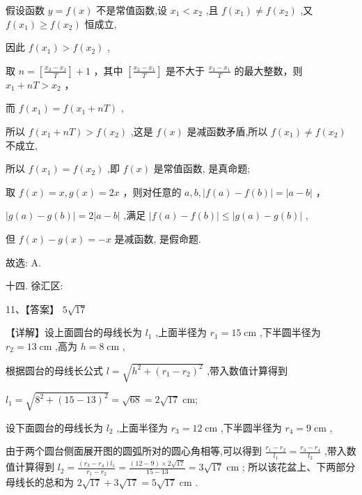 \documentclass[10pt]{article}
\newcommand*\circled[1]{\tikz[baseline=(char.base)]{\node[shape=circle,draw,inner sep=1.5pt] (char) {\small #1};}}
\begin{document}
假设函数 \(y = f\left( x\right)\) 不是常值函数,设 \({x}_{1} < {x}_{2}\) ,且 \(f\left( {x}_{1}\right)  \neq  f\left( {x}_{2}\right)\) ,又 \(f\left( {x}_{1}\right)  \geq  f\left( {x}_{2}\right)\) 恒成立,

因此 \(f\left( {x}_{1}\right)  > f\left( {x}_{2}\right)\) ,

取 \(n = \left\lbrack  \frac{{x}_{2} - {x}_{1}}{T}\right\rbrack   + 1\) ，其中 \(\left\lbrack  \frac{{x}_{2} - {x}_{1}}{T}\right\rbrack\) 是不大于 \(\frac{{x}_{2} - {x}_{1}}{T}\) 的最大整数，则 \({x}_{1} + {nT} > {x}_{2}\) ，

而 \(f\left( {x}_{1}\right)  = f\left( {{x}_{1} + {nT}}\right)\) ,

所以 \(f\left( {{x}_{1} + {nT}}\right)  > f\left( {x}_{2}\right)\) ,这是 \(f\left( x\right)\) 是减函数矛盾,所以 \(f\left( {x}_{1}\right)  \neq  f\left( {x}_{2}\right)\) 不成立,

所以 \(f\left( {x}_{1}\right)  = f\left( {x}_{2}\right)\) ,即 \(f\left( x\right)\) 是常值函数, \circled{1} 是真命题;

 \circled{2} 取 \(f\left( x\right)  = x,g\left( x\right)  = {2x}\) ，则对任意的 \(a,b,\left| {f\left( a\right)  - f\left( b\right) }\right|  = \left| {a - b}\right|\) ，

\(\left| {g\left( a\right)  - g\left( b\right) }\right|  = 2\left| {a - b}\right|\) ,满足 \(\left| {f\left( a\right)  - f\left( b\right) }\right|  \leq  \left| {g\left( a\right)  - g\left( b\right) }\right|\) ,

但 \(f\left( x\right)  - g\left( x\right)  =  - x\) 是减函数, \circled{2} 是假命题.

故选: A.

十四. 徐汇区:

11、【答案】 \(5\sqrt{17}\)

【详解】设上面圆台的母线长为 \({l}_{1}\) ,上面半径为 \({r}_{1} = {15}\mathrm{\;{cm}}\) ,下半圆半径为 \({r}_{2} = {13}\mathrm{\;{cm}}\) ,高为 \(h = 8\mathrm{\;{cm}}\) ,

根据圆台的母线长公式 \(l = \sqrt{{h}^{2} + {\left( {r}_{1} - {r}_{2}\right) }^{2}}\) ,带入数值计算得到

\({l}_{1} = \sqrt{{8}^{2} + {\left( {15} - {13}\right) }^{2}} = \sqrt{68} = 2\sqrt{17}\mathrm{\;{cm}};\)

设下面圆台的母线长为 \({l}_{2}\) ,上面半径为 \({r}_{3} = {12}\mathrm{\;{cm}}\) ,下半圆半径为 \({r}_{4} = 9\mathrm{\;{cm}}\) ,

由于两个圆台侧面展开图的圆弧所对的圆心角相等,可以得到 \(\frac{{r}_{1} - {r}_{2}}{{l}_{1}} = \frac{{r}_{3} - {r}_{4}}{{l}_{2}}\) ,带入数值计算得到 \({l}_{2} = \frac{\left( {{r}_{3} - {r}_{4}}\right) {l}_{1}}{{r}_{1} - {r}_{2}} = \frac{\left( {{12} - 9}\right)  \times  2\sqrt{17}}{{15} - {13}} = 3\sqrt{17}\mathrm{\;{cm}}\) ; 所以该花盆上、下两部分母线长的总和为 \(2\sqrt{17} + 3\sqrt{17} = 5\sqrt{17}\mathrm{\;{cm}}\) .
\end{document}

